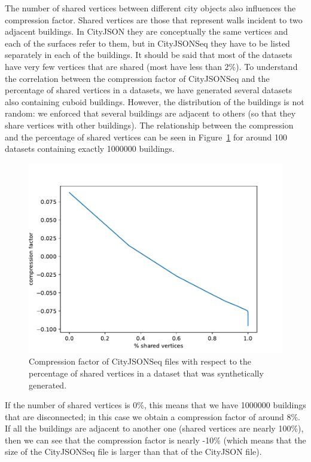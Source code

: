 \documentclass{isprs} %
\begin{document}
The number of shared vertices between different city objects also influences the compression factor. 
Shared vertices are those that represent walls incident to two adjacent buildings.
In CityJSON they are conceptually the same vertices and each of the surfaces refer to them, but in CityJSONSeq they have to be listed separately in each of the buildings.
It should be said that most of the datasets have very few vertices that are shared (most have less than 2\%).
To understand the correlation between the compression factor of CityJSONSeq and the percentage of shared vertices in a datasets, we have generated several datasets also containing cuboid buildings. 
However, the distribution of the buildings is not random: we enforced that several buildings are adjacent to others (so that they share vertices with other buildings).
The relationship between the compression and the percentage of shared vertices can be seen in Figure~\ref{fig:compression_adjacent} for around 100 datasets containing exactly \num{1000000} buildings.
\begin{figure}
  \centering
  \includegraphics[width=\linewidth]{figs/compression_adjacent.pdf}
  \caption{Compression factor of CityJSONSeq files with respect to the percentage of shared vertices in a dataset that was synthetically generated.}%
\label{fig:compression_adjacent}
\end{figure}
If the number of shared vertices is 0\%, this means that we have \num{1000000} buildings that are disconnected; in this case we obtain a compression factor of around 8\%.
If all the buildings are adjacent to another one (shared vertices are nearly 100\%), then we can see that the compression factor is nearly -10\% (which means that the size of the CityJSONSeq file is larger than that of the CityJSON file).
\end{document}
